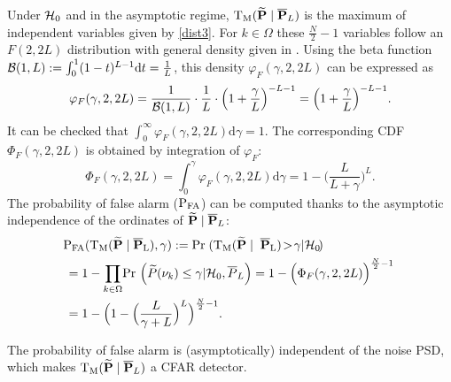 \documentclass[journal]{IEEEtran}
\begin{document}
Under ${\cal{H}}_0$ and in the asymptotic regime, ${\rm T_M}({\bf \widetilde{\bf P}}\;|\;\overline{\bf P}_L)$ 
is the maximum of independent variables given by \eqref{dist3}. For $k \in \Omega$ these $\frac{N}{2}-1$ variables follow an $F(2,2L)$ distribution with general density given in \cite{Abramowitz_1972}. Using the beta function ${\cal{B}}(1,L):=\int_0^1(1-t)^{L-1}\textrm{d}t=\frac{1}{L}$, this density $\varphi_F(\gamma,2,2L)$ can be expressed as
$$
\varphi_F(\gamma,2,2L)=\frac{1}{{\cal{B}}(1,L)}\cdot\frac{1}{L}\cdot \Big(1+\frac{\gamma}{L}\Big)^{-L-1}=\Big(1+\frac{\gamma}{L}\Big)^{-L-1}.
$$
It can be checked that $\int_0^\infty\varphi_F(\gamma,2,2L)\mathrm{d}\gamma=1$. 
The corresponding CDF  $\Phi_F(\gamma,2,2L)$ is obtained  by  integration of $\varphi_F$:
\begin{equation} 
	\Phi_F(\gamma,2,2L) = \displaystyle \int_{0}^{\gamma} \varphi_F(\gamma,2,2L) \mathrm{d}\gamma = 1 - \Bigg(\frac{L}{L+\gamma} \Bigg)^L.
	\label{laphi}
 \end{equation}
The probability of false alarm ($\rm{P_{FA}}$) can be computed thanks to the  asymptotic independence of the ordinates of ${\widetilde{\bf P}\; |\; \overline{\bf P}_L}$:
\begin{equation} 
\begin{aligned} 
	&\!\rm{P_{FA}}({{\rm T_M}} ({\bf \widetilde{\bf P}}\;|\;\overline{\bf P}_L) ,\gamma) := \textrm{Pr}\; ({\rm T_M}({\bf \widetilde{\bf P}}\;|\;\;\overline{\bf P}_L)\! > \!\gamma | {\cal{H}}_0\!) \\
		&=1 -\displaystyle{ \prod_{k\in \Omega}} \textrm {Pr}\, \left(\widetilde{P}({ \nu_k})  \leq \gamma | {\cal{H}}_0,\overline{P}_L\right) = 1 - \Big(\Phi_F(\gamma,2,2L)\Big)^{\frac{N}{2}-1}\\
		&= 1-  \Big( 1-\Big(\frac{L}{\gamma+L}\Big)^L\Big)^{\frac{N}{2}-1}.
\end{aligned}
\label{pfa}
 \end{equation}
 
The probability of false alarm  is { (asymptotically)} independent of the  noise PSD, which makes   ${\rm T_M}({\bf \widetilde{\bf P}}\;|\;\overline{\bf P}_L)$ a CFAR detector. 
\end{document}
